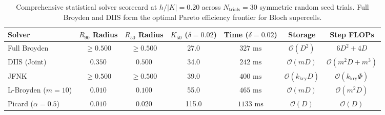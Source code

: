 \begin{table}[htbp]
\centering
\small
\begin{tabular}{lcccccc}
\toprule
\textbf{Solver} & \textbf{$R_{90}$ Radius} & \textbf{$R_{50}$ Radius} & \textbf{$K_{50}$ ($\delta=0.02$)} & \textbf{Time ($\delta=0.02$)} & \textbf{Storage} & \textbf{Step FLOPs} \\
\midrule
Full Broyden   & $\ge 0.500$ & $\ge 0.500$ & 27.0 & $327\text{ ms}$ & $\mathcal{O}(D^2)$ & $6 D^2 + 4D$ \\
DIIS (Joint)   & $0.350$     & $0.500$     & 34.0 & $242\text{ ms}$ & $\mathcal{O}(mD)$   & $\mathcal{O}(m^2 D + m^3)$ \\
JFNK           & $\ge 0.500$ & $\ge 0.500$ & 39.0 & $400\text{ ms}$ & $\mathcal{O}(k_{\mathrm{kry}} D)$ & $\mathcal{O}(k_{\mathrm{kry}} \Phi)$ \\
L-Broyden ($m=10$) & $0.010$ & $0.100$     & 55.0 & $465\text{ ms}$ & $\mathcal{O}(mD)$   & $\mathcal{O}(m^2 D)$ \\
Picard ($\alpha=0.5$) & $0.010$ & $0.020$ & 115.0 & $1133\text{ ms}$ & $\mathcal{O}(D)$   & $\mathcal{O}(D)$ \\
\bottomrule
\end{tabular}
\caption{Comprehensive statistical solver scorecard at $h/|K|=0.20$ across $N_{\mathrm{trials}}=30$ symmetric random seed trials. Full Broyden and DIIS form the optimal Pareto efficiency frontier for Bloch supercells.}
\label{tab:m1_6_solver_scorecard}
\end{table}
